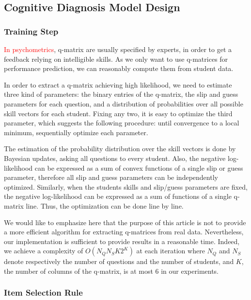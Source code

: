 \documentclass{sig-alternate}
\newcommand\alert[1]{\textcolor{red}{#1}}
\begin{document}
\subsection{Cognitive Diagnosis Model Design}

\subsubsection{Training Step}

\alert{In psychometrics}, q-matrix are usually specified by experts, in order to get a feedback relying on intelligible skills. As we only want to use q-matrices for performance prediction, we can reasonably compute them from student data.

In order to extract a q-matrix achieving high likelihood, we need to estimate three kind of parameters: the binary entries of the q-matrix, the slip and guess parameters for each question, and a distribution of probabilities over all possible skill vectors for each student. Fixing any two, it is easy to optimize the third parameter, which suggests the following procedure: until convergence to a local minimum, sequentially optimize each parameter.

The estimation of the probability distribution over the skill vectors is done by Bayesian updates, asking all questions to every student. Also, the negative log-likelihood can be expressed as a sum of convex functions of a single slip or guess parameter, therefore all slip and guess parameters can be independently optimized.  Similarly, when the students skills and slip/guess parameters are fixed, the negative log-likelihood can be expressed as a sum of functions of a single q-matrix line. Thus, the optimization can be done line by line. %

We would like to emphasize here that the purpose of this article is not to provide a more efficient algorithm for extracting q-matrices from real data. Nevertheless, our implementation is sufficient to provide results in a reasonable time. Indeed, we achieve a complexity of $O(N_Q N_S K 2^K)$ at each iteration where $N_Q$ and $N_S$ denote respectively the number of questions and the number of students, and $K$, the number of columns of the q-matrix, is at most 6 in our experiments.

\subsubsection{Item Selection Rule}
\end{document}
